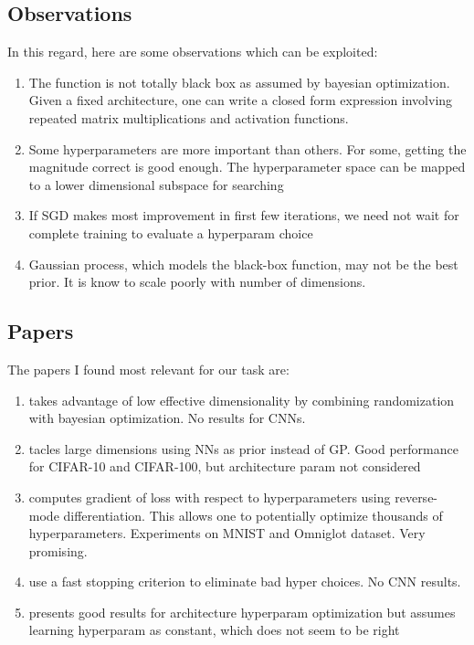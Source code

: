 \documentclass{article}
\begin{document}
\vspace{4mm}
\subsection*{Observations}
In this regard, here are some observations which can be exploited:

\begin{enumerate}
	\item The function is not totally black box as assumed by bayesian optimization. Given a fixed architecture, one can write a closed form expression involving repeated matrix multiplications and activation functions.
	\item Some hyperparameters are more important than others. For some, getting the magnitude correct is good enough. The hyperparameter space can be mapped to a lower dimensional subspace for searching
	\item If SGD makes most improvement in first few iterations, we need not wait for complete training to evaluate a hyperparam choice 

	\item Gaussian process, which models the black-box function, may not be the best prior. It is know to scale poorly with number of dimensions. 
\end{enumerate}

\vspace{4mm}
\subsection*{Papers}
The papers I found most relevant for our task are:

\begin{enumerate}
	\item \cite{wang2013bayesian} takes advantage of low effective dimensionality by combining randomization with bayesian optimization. No results for CNNs.
	\item \cite{snoek2015scalable} tacles large dimensions using NNs as prior instead of GP. Good performance for CIFAR-10 and CIFAR-100, but architecture param not considered
	\item \cite{maclaurin2015gradient} computes gradient of loss with respect to hyperparameters using reverse-mode differentiation. This allows one to potentially optimize thousands of hyperparameters. Experiments on MNIST and Omniglot dataset. Very promising.
	\item \cite{swersky2014freeze} use a fast stopping criterion to eliminate bad hyper choices. No CNN results.
	\item \cite{talathi2015hyper} presents good results for architecture hyperparam optimization but assumes learning hyperparam as constant, which does not seem to be right 
\end{enumerate}
\end{document}

